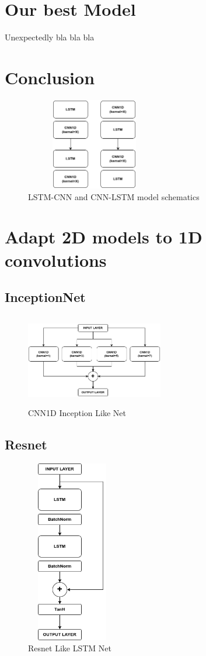 \documentclass[11pt]{article}
\begin{document}
\section{Our best Model}
Unexpectedly bla bla bla

\section{Conclusion}

\begin{figure}[h]
\centering
\includegraphics[width=6cm, height=4cm]{LSTMCNN}
\caption{LSTM-CNN and CNN-LSTM model schematics}
\end{figure}

\section{Adapt 2D models to 1D convolutions}
\subsection{InceptionNet}
\begin{figure}[h]
\centering
\includegraphics[width=6cm, height=4cm]{Inception}
\caption{CNN1D Inception Like Net}
\end{figure}

\subsection{Resnet}
\begin{figure}[h]
\centering
\includegraphics[width=4cm, height=8cm,angle =90]{resnet}
\caption{Resnet Like LSTM Net}
\end{figure}




\end{document}

